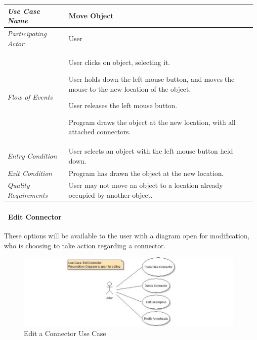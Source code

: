 \documentclass[twoside,letterpaper]{article}
\newenvironment{my_enumerate}{
\begin{enumerate}
  \setlength{\itemsep}{1pt}
  \setlength{\parskip}{0pt}
  \setlength{\parsep}{0pt}}{\end{enumerate}
}
\begin{document}
\begin{flushleft}
\tablehead{}
\begin{tabular}{|m{2.0in} m{5.0in}|}
\hline
{\bfseries\emph{Use Case Name}}
& {\bfseries Move Object}
\\\hline
\emph{Participating Actor}
& User
\\\hline
\emph{Flow of Events}
& \begin{my_enumerate}
\item User clicks on object, selecting it.
\item User holds down the left mouse button, and moves the mouse to the new location of the object.
\item User releases the left mouse button.
\item Program draws the object at the new location, with all attached connectors. 
\end{my_enumerate}
\\\hline
\emph{Entry Condition}
& User selects an object with the left mouse button held down.
\\\hline
\emph{Exit Condition}
& Program has drawn the object at the new location.
\\\hline
\emph{Quality Requirements}
& User may not move an object to a location already occupied by another object. 
\\\hline
\end{tabular}
\end{flushleft}
\bigskip


\clearpage

\paragraph[\ Use Category]
{\ Edit Connector} {These options will be available to the user with a diagram open for modification, who is choosing to take action regarding a connector.}

\begin{figure}[h]
\centering
\includegraphics[width=6.0in]{ucaseEditConn.jpg}
\caption{Edit a Connector Use Case}
\end{figure}
\end{document}
